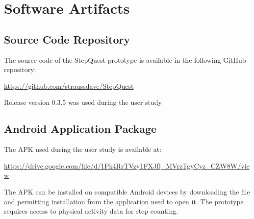 \chapter{Software Artifacts}
\label{app:software-artifacts}

\section{Source Code Repository}

The source code of the StepQuest prototype is available in the following
GitHub repository:

\begin{center}
	\url{https://github.com/straussdave/StepQuest}
\end{center}

Release version 0.3.5 was used during the user study

\section{Android Application Package}

The APK used during the user study is available at:

\begin{center}
	\url{https://drive.google.com/file/d/1Pk4RrTVzy1FXJfj_MVrzTgyCyz_CZW8W/view}
\end{center}

The APK can be installed on compatible Android devices by downloading the file
and permitting installation from the application used to open it. The
prototype requires access to physical activity data for step counting.
